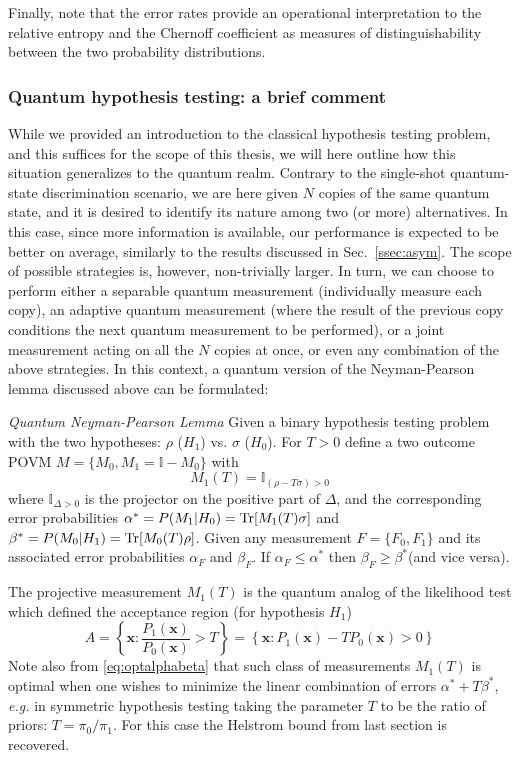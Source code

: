 Finally, note that the error rates provide an operational interpretation to the relative entropy and the Chernoff coefficient as measures of distinguishability between the two probability distributions.

\subsubsection{Quantum hypothesis testing: a brief comment}
While we provided an introduction to the classical hypothesis testing problem, and this suffices for the scope of this thesis, we will here outline how this situation generalizes to the quantum realm. Contrary to the single-shot quantum-state discrimination scenario, we are here given $N$ copies of the same quantum state, and it is desired to identify its nature among two (or more) alternatives. In this case, since more information is available, our performance is expected to be better on average, similarly to the results discussed in Sec.~\ref{ssec:asym}. The scope of possible strategies is, however, non-trivially larger. In turn, we can choose to perform either a separable quantum measurement (individually measure each copy), an adaptive quantum measurement (where the result of the previous copy conditions the next quantum measurement to be performed), or a joint measurement acting on all the $N$ copies at once, or even any combination of the above strategies. In this context, a quantum version of the Neyman-Pearson lemma discussed above can be formulated:

\textit{Quantum Neyman-Pearson Lemma}
Given a binary hypothesis testing problem with the two hypotheses:  $\rho$ ($H_{1}$) vs. $\sigma$ ($H_{0}$). For  $T>0$ define a two outcome POVM $M=\{M_{0},M_{1}=\mathbb{I} -M_{0}\}$ with
\begin{equation}\label{eq:optalphabeta}
M_{1}(T)=\mathbb{I} _{(\rho-T \sigma)>0}
\end{equation}
where $\mathbb{I} _{\Delta>0}$ is the projector on the positive part of $\Delta$,
and the corresponding error probabilities $\alpha^{*}=P(M_{1}|H_{0})=\text{Tr}[M_{1}(T)\sigma]$ and $\beta^{*}=P(M_{0}|H_{1})=\text{Tr}[M_{0}(T)\rho]$. Given any measurement $F=\{F_{0},F_{1}\}$ and its associated error probabilities $\alpha_{F}$ and $\beta_{F}$. If $\alpha_{F}\leq\alpha^{*}$ then $\beta_{F}\geq \beta^{*}$(and vice versa).

The projective measurement $M_{1}(T)$ is the quantum analog of the likelihood test which defined the acceptance region (for hypothesis $H_{1}$)
$$A=\left\{ \mathbf{x}: \frac{P_{1}(\mathbf{x})}{P_{0}(\mathbf{x})}> T\right\}=
\left\{ \mathbf{x}: P_{1}(\mathbf{x})-T P_{0}(\mathbf{x})> 0 \right\}$$
Note also from \eqref{eq:optalphabeta} that such class of measurements $M_{1}(T)$ is optimal when one wishes to minimize the linear combination of errors  $\alpha^{*}+T  \beta^{*}$, \textit{e.g.} in symmetric hypothesis testing taking the parameter $T$ to be the ratio of priors: $T=\pi_{0}/\pi_{1}$. For this case the Helstrom bound from last section is recovered.

